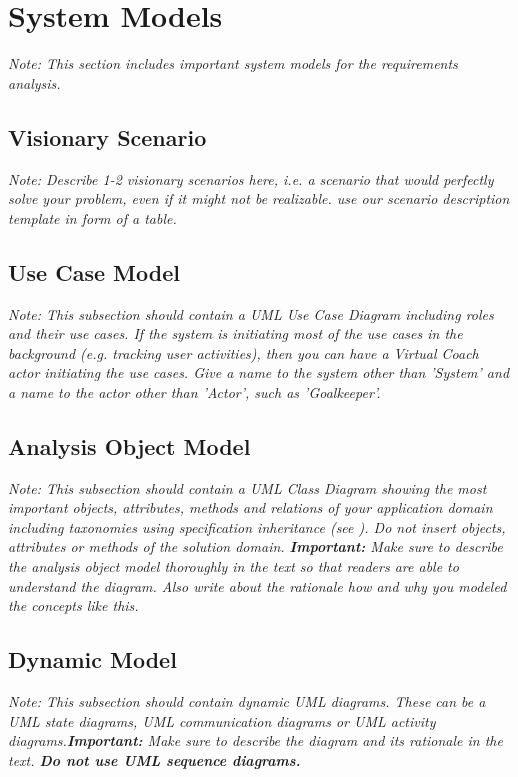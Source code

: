 \documentclass[a4paper,12pt,twoside]{report}
\begin{document}
\section{System Models}

\textit{Note: This section includes important system models for the requirements analysis.}

\subsection{Visionary Scenario}

\textit{Note: Describe 1-2 visionary scenarios here, i.e. a scenario that would perfectly solve your problem, even if it might not be realizable. use our scenario description template in form of a table.}

\subsection{Use Case Model}

\textit{Note: This subsection should contain a UML Use Case Diagram including roles and their use cases. If the system is initiating most of the use cases in the background (e.g. tracking user activities), then you can have a Virtual Coach actor initiating the use cases. Give a name to the system other than 'System' and a name to the actor other than 'Actor', such as 'Goalkeeper'.}

\subsection{Analysis Object Model}

\textit{Note: This subsection should contain a UML Class Diagram showing the most important objects, attributes, methods and relations of your application domain including taxonomies using specification inheritance (see \cite{bruegge2004object}). Do not insert objects, attributes or methods of the solution domain.
\textbf{Important:} Make sure to describe the analysis object model thoroughly in the text so that readers are able to understand the diagram. Also write about the rationale how and why you modeled the concepts like this.}

\subsection{Dynamic Model}

\textit{Note: This subsection should contain dynamic UML diagrams. These can be a UML state diagrams, UML communication diagrams or UML activity diagrams.\textbf{Important:} Make sure to describe the diagram and its rationale in the text. \textbf{Do not use UML sequence diagrams.}}
\end{document}
